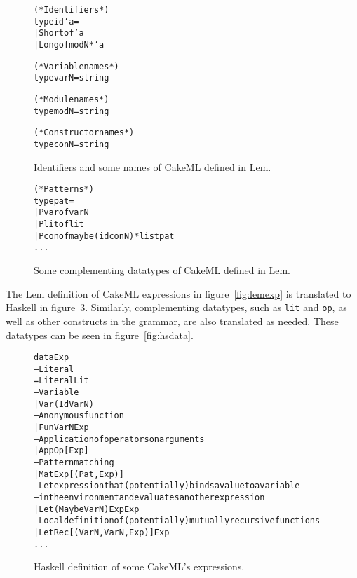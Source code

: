 \begin{figure}
\begin{alltt}
  (* Identifiers *)
  type id 'a =
    | Short of 'a
    | Long of modN * 'a


  (* Variable names *)
  type varN = string

  (* Module names *)
  type modN = string

  (* Constructor names *)
  type conN = string

\end{alltt}
\caption{Identifiers and some names of CakeML defined in Lem.}
\label{fig:lemid}
\end{figure}

\begin{figure}
\begin{alltt}
  (* Patterns *)
  type pat =
    | Pvar of varN
    | Plit of lit
    | Pcon of maybe (id conN) * list pat
    ...
\end{alltt}
\caption{Some complementing datatypes of CakeML defined in Lem.}
\label{fig:lempat}
\end{figure}

The Lem definition of CakeML expressions in figure~\ref{fig:lemexp} is
translated to Haskell in figure~\ref{fig:hsexp}.
Similarly, complementing datatypes, such as \texttt{lit} and
\texttt{op}, as well as other constructs in the grammar, are also translated
as needed. These datatypes can be seen in figure~\ref{fig:hsdata}.

\begin{figure}
\begin{alltt}
  data Exp
    -- Literal
    = Literal Lit
    -- Variable
    | Var (Id VarN)
    -- Anonymous function
    | Fun VarN Exp
    -- Application of operators on arguments
    | App Op [Exp]
    -- Pattern matching
    | Mat Exp [(Pat, Exp)]
    -- Let expression that (potentially) binds a value to a variable
    -- in the environment and evaluates another expression
    | Let (Maybe VarN) Exp Exp
    -- Local definition of (potentially) mutually recursive functions
    | LetRec [(VarN, VarN, Exp)] Exp
    ...
\end{alltt}
\caption{Haskell definition of some CakeML's expressions.}
\label{fig:hsexp}
\end{figure}

